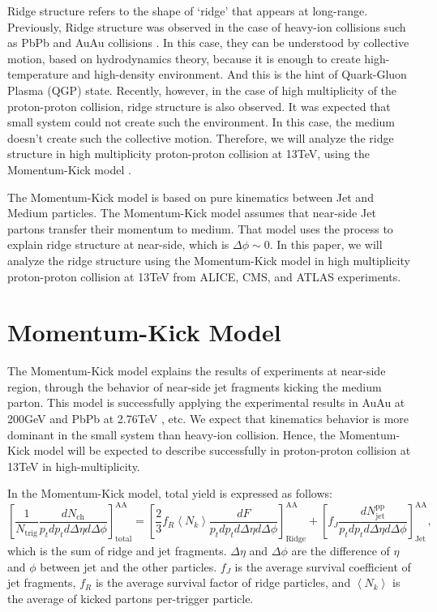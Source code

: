 \documentclass[12pt]{article}
\begin{document}
Ridge structure refers to the shape of ‘ridge’ that appears at long-range.
Previously, Ridge structure was observed in the case of heavy-ion collisions such as PbPb \cite{ref1, ref2, ref3, ref4, ref5, ref6, ref7, ref8, ref9, ref10, ref11} 
and AuAu collisions \cite{ref12, ref13, ref14, ref15, ref16, ref17, ref18, ref19, ref20, ref21, ref22, ref23, ref24, ref25, ref26, ref27}. 
In this case, they can be understood by collective motion, based on hydrodynamics theory, because it is enough to create high-temperature and high-density environment.
And this is the hint of Quark-Gluon Plasma (QGP) state.
Recently, however, in the case of high multiplicity of the proton-proton collision, ridge structure is also observed.
It was expected that small system could not create such the environment. 
In this case, the medium doesn’t create such the collective motion.
Therefore, we will analyze the ridge structure in high multiplicity proton-proton collision at 13TeV, using the Momentum-Kick model \cite{Wong_2, Wong_3, Wong_4, Wong_5}.

The Momentum-Kick model is based on pure kinematics between Jet and Medium particles.
The Momentum-Kick model assumes that near-side Jet partons transfer their momentum to medium.
That model uses the process to explain ridge structure at near-side, which is $\Delta \phi \sim 0$.
In this paper, we will analyze the ridge structure using the Momentum-Kick model in high multiplicity proton-proton collision 
at 13TeV from ALICE, CMS, and ATLAS experiments.


\section*{Momentum-Kick Model}


The Momentum-Kick model explains the results of experiments at near-side region, through the behavior of near-side jet fragments kicking the medium parton. 
This model is successfully applying the experimental results in AuAu at 200GeV \cite{Wong_1} and PbPb at 2.76TeV \cite{PbPb}, etc. 
We expect that kinematics behavior is more dominant in the small system than heavy-ion collision.
Hence, the Momentum-Kick model will be expected to describe successfully in proton-proton collision at 13TeV in high-multiplicity.

In the Momentum-Kick model, total yield is expressed as follows:
\begin{equation} \label{equation:eq1}
\left[\frac{1}{N_{\text{trig}}}\frac{dN_{\text{ch}}}{p_tdp_td\Delta\eta d\Delta\phi}\right]_{\text{total}}^{\text{AA}}
= \left[{\frac{2}{3}}f_R\left\langle N_k\right\rangle\frac{dF}{p_tdp_td\Delta\eta d\Delta\phi}\right]_{\text{Ridge}}^{\text{AA}}
+ \left[f_J\frac{dN_{\text{jet}}^{\text{pp}}}{p_tdp_td\Delta\eta d\Delta\phi}\right]_{\text{Jet}}^{\text{AA}},
\end{equation}
which is the sum of ridge and jet fragments.
$\Delta \eta $ and $\Delta \phi$ are the difference of $\eta$ and $\phi$ between jet and the other particles.
$f_J$ is the average survival coefficient of jet fragments, 
$f_R$ is the average survival factor of ridge particles, 
and $\left\langle N_k\right\rangle$ is the average of kicked partons per-trigger particle.
\end{document}
